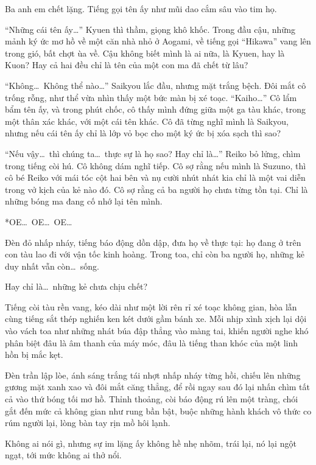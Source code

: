 \documentclass[../main.tex]{subfiles}
\begin{document}
Ba anh em chết lặng. Tiếng gọi tên ấy như mũi dao cắm sâu vào tim họ.

``Những cái tên ấy\dots'' Kyuen thì thầm, giọng khô khốc. Trong đầu cậu, những mảnh ký ức mơ hồ về một căn nhà nhỏ ở Aogami, về tiếng gọi ``Hikawa'' vang lên trong gió, bất chợt ùa về. Cậu không biết mình là ai nữa, là Kyuen, hay là Kuon? Hay cả hai đều chỉ là tên của một con ma đã chết từ lâu?

``Không\dots\ Không thể nào\dots'' Saikyou lắc đầu, nhưng mặt trắng bệch. Đôi mắt cô trống rỗng, như thể vừa nhìn thấy một bức màn bị xé toạc. ``Kaiho\dots'' Cô lẩm bẩm tên ấy, và trong phút chốc, cô thấy mình đứng giữa một ga tàu khác, trong một thân xác khác, với một cái tên khác. Cô đã từng nghĩ mình là Saikyou, nhưng nếu cái tên ấy chỉ là lớp vỏ bọc cho một ký ức bị xóa sạch thì sao?

``Nếu vậy\dots\ thì chúng ta\dots\ thực sự là họ sao? Hay chỉ là\dots'' Reiko bỏ lửng, chìm trong tiếng còi hú. Cô không dám nghĩ tiếp. Cô sợ rằng nếu mình là Suzuno, thì cô bé Reiko với mái tóc cột hai bên và nụ cười nhút nhát kia chỉ là một vai diễn trong vở kịch của kẻ nào đó. Cô sợ rằng cả ba người họ chưa từng tồn tại. Chỉ là những bóng ma đang cố nhớ lại tên mình.

*OE\dots\ OE\dots\ OE\dots*

Đèn đỏ nhấp nháy, tiếng báo động dồn dập, đưa họ về thực tại: họ đang ở trên con tàu lao đi với vận tốc kinh hoàng. Trong toa, chỉ còn ba người họ, những kẻ duy nhất vẫn còn\dots\ sống.

Hay chỉ là\dots\ những kẻ chưa chịu chết?

\ct

Tiếng còi tàu rền vang, kéo dài như một lời rên rỉ xé toạc không gian, hòa lẫn cùng tiếng sắt thép nghiến ken két dưới gầm bánh xe. Mỗi nhịp xình xịch lại dội vào vách toa như những nhát búa đập thẳng vào màng tai, khiến người nghe khó phân biệt đâu là âm thanh của máy móc, đâu là tiếng than khóc của một linh hồn bị mắc kẹt.

Đèn trần lập lòe, ánh sáng trắng tái nhợt nhấp nháy từng hồi, chiếu lên những gương mặt xanh xao và đôi mắt căng thẳng, để rồi ngay sau đó lại nhấn chìm tất cả vào thứ bóng tối mơ hồ. Thỉnh thoảng, còi báo động rú lên một tràng, chói gắt đến mức cả không gian như rung bần bật, buộc những hành khách vô thức co rúm người lại, lòng bàn tay rịn mồ hôi lạnh.

Không ai nói gì, nhưng sự im lặng ấy không hề nhẹ nhõm, trái lại, nó lại ngột ngạt, tới mức không ai thở nổi.
\end{document}
